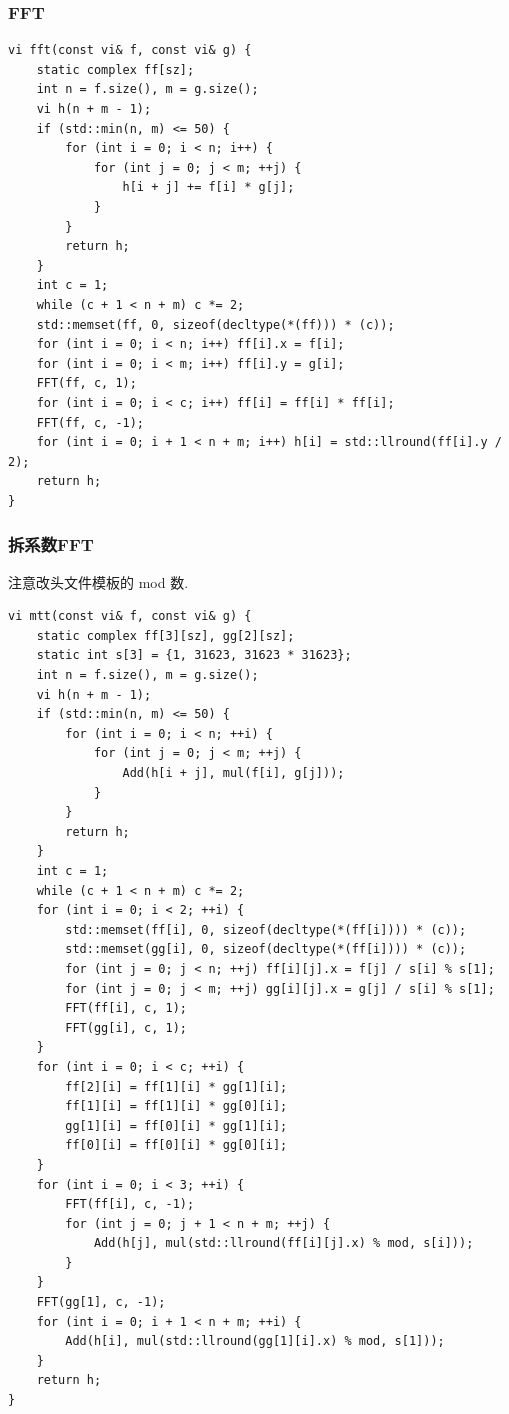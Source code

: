 \documentclass[UTF8, a4paper, titlepage, twoside]{ctexart}
\begin{document}
\subsubsection{ FFT }
\begin{lstlisting}[style=cpp]
vi fft(const vi& f, const vi& g) {
    static complex ff[sz];
    int n = f.size(), m = g.size();
    vi h(n + m - 1);
    if (std::min(n, m) <= 50) {
        for (int i = 0; i < n; i++) {
            for (int j = 0; j < m; ++j) {
                h[i + j] += f[i] * g[j];
            }
        }
        return h;
    }
    int c = 1;
    while (c + 1 < n + m) c *= 2;
    std::memset(ff, 0, sizeof(decltype(*(ff))) * (c));
    for (int i = 0; i < n; i++) ff[i].x = f[i];
    for (int i = 0; i < m; i++) ff[i].y = g[i];
    FFT(ff, c, 1);
    for (int i = 0; i < c; i++) ff[i] = ff[i] * ff[i];
    FFT(ff, c, -1);
    for (int i = 0; i + 1 < n + m; i++) h[i] = std::llround(ff[i].y / 2);
    return h;
}
\end{lstlisting}

\subsubsection{ 拆系数FFT }
注意改头文件模板的 mod 数.
\begin{lstlisting}[style=cpp]
vi mtt(const vi& f, const vi& g) {
    static complex ff[3][sz], gg[2][sz];
    static int s[3] = {1, 31623, 31623 * 31623};
    int n = f.size(), m = g.size();
    vi h(n + m - 1);
    if (std::min(n, m) <= 50) {
        for (int i = 0; i < n; ++i) {
            for (int j = 0; j < m; ++j) {
                Add(h[i + j], mul(f[i], g[j]));
            }
        }
        return h;
    }
    int c = 1;
    while (c + 1 < n + m) c *= 2;
    for (int i = 0; i < 2; ++i) {
        std::memset(ff[i], 0, sizeof(decltype(*(ff[i]))) * (c));
        std::memset(gg[i], 0, sizeof(decltype(*(ff[i]))) * (c));
        for (int j = 0; j < n; ++j) ff[i][j].x = f[j] / s[i] % s[1];
        for (int j = 0; j < m; ++j) gg[i][j].x = g[j] / s[i] % s[1];
        FFT(ff[i], c, 1);
        FFT(gg[i], c, 1);
    }
    for (int i = 0; i < c; ++i) {
        ff[2][i] = ff[1][i] * gg[1][i];
        ff[1][i] = ff[1][i] * gg[0][i];
        gg[1][i] = ff[0][i] * gg[1][i];
        ff[0][i] = ff[0][i] * gg[0][i];
    }
    for (int i = 0; i < 3; ++i) {
        FFT(ff[i], c, -1);
        for (int j = 0; j + 1 < n + m; ++j) {
            Add(h[j], mul(std::llround(ff[i][j].x) % mod, s[i]));
        }
    }
    FFT(gg[1], c, -1);
    for (int i = 0; i + 1 < n + m; ++i) {
        Add(h[i], mul(std::llround(gg[1][i].x) % mod, s[1]));
    }
    return h;
}
\end{lstlisting}
\end{document}
